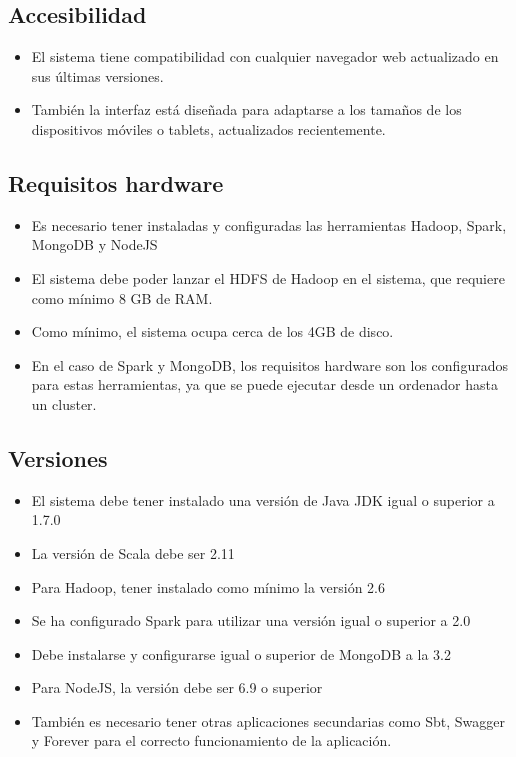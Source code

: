 \subsection{Accesibilidad}
\begin{itemize}
	\item El sistema tiene compatibilidad con cualquier navegador web actualizado en sus últimas versiones.
	\item También la interfaz está diseñada para adaptarse a los tamaños de los dispositivos móviles o tablets, actualizados recientemente.
\end{itemize}

\subsection{Requisitos hardware}
\begin{itemize}
	\item Es necesario tener instaladas y configuradas las herramientas Hadoop, Spark, MongoDB y NodeJS
	\item El sistema debe poder lanzar el HDFS de Hadoop en el sistema, que requiere como mínimo 8 GB de RAM.
	\item Como mínimo, el sistema ocupa cerca de los 4GB de disco.
	\item En el caso de Spark y MongoDB, los requisitos hardware son los configurados para estas herramientas, ya que se puede ejecutar desde un ordenador hasta un cluster. 
\end{itemize}

\subsection{Versiones}
\begin{itemize}
	\item El sistema debe tener instalado una versión de Java JDK igual o superior a 1.7.0
	\item La versión de Scala debe ser 2.11
	\item Para Hadoop, tener instalado como mínimo la versión 2.6
	\item Se ha configurado Spark para utilizar una versión igual o superior a 2.0
	\item Debe instalarse y configurarse igual o superior de MongoDB a la 3.2
	\item Para NodeJS, la versión debe ser 6.9 o superior
	\item También es necesario tener otras aplicaciones secundarias como Sbt, Swagger y Forever para el correcto funcionamiento de la aplicación.
\end{itemize}


